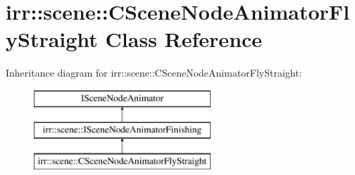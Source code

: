 \hypertarget{classirr_1_1scene_1_1_c_scene_node_animator_fly_straight}{\section{irr\-:\-:scene\-:\-:C\-Scene\-Node\-Animator\-Fly\-Straight Class Reference}
\label{classirr_1_1scene_1_1_c_scene_node_animator_fly_straight}
}
Inheritance diagram for irr\-:\-:scene\-:\-:C\-Scene\-Node\-Animator\-Fly\-Straight\-:\begin{figure}[H]
\begin{center}
\leavevmode
\includegraphics[height=3.000000cm]{classirr_1_1scene_1_1_c_scene_node_animator_fly_straight}
\end{center}
\end{figure}
